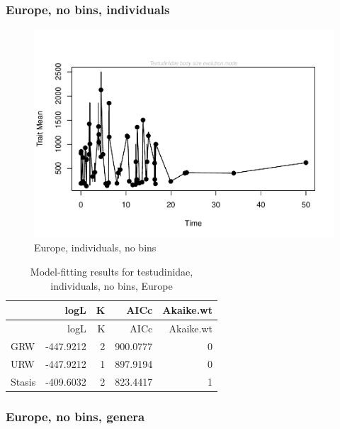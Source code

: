 \documentclass[]{article}
\begin{document}
\newpage 

\subsubsection{Europe, no bins,
individuals}\label{europe-no-bins-individuals}

\begin{figure}[htbp]
\centering
\includegraphics{MA_JJ_files/figure-latex/paleoTS, no bins individuals, Europe-1.pdf}
\caption{Europe, individuals, no bins}
\end{figure}

\begin{longtable}[]{@{}lrrrr@{}}
\caption{Model-fitting results for testudinidae, individuals, no bins,
Europe}\tabularnewline
\toprule
& logL & K & AICc & Akaike.wt\tabularnewline
\midrule
\endfirsthead
\toprule
& logL & K & AICc & Akaike.wt\tabularnewline
\midrule
\endhead
GRW & -447.9212 & 2 & 900.0777 & 0\tabularnewline
URW & -447.9212 & 1 & 897.9194 & 0\tabularnewline
Stasis & -409.6032 & 2 & 823.4417 & 1\tabularnewline
\bottomrule
\end{longtable}

\newpage 

\subsubsection{Europe, no bins, genera}\label{europe-no-bins-genera}
\end{document}
